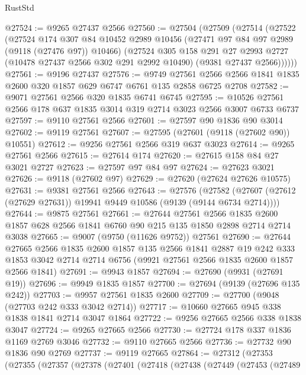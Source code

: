 \begin{lexlean}{RustStd}
\begin{coremodule}
@27524 := @9265 @27437 @2566
@27560 := @27504
    (@27509
      (@27514
        (@27522
          (@27524
            @174
            @307
            @84
            @10452
            @2989
            @10456
            (@27471 @97 @84 @97 @2989 (@9118 (@27476 @97)) @10466)
            (@27524
              @305
              @158
              @291
              @27
              @2993
              @2727
              (@10478 @27437 @2566 @302 @291 @2992 @10490)
              (@9381 @27437 @2566))))))
@27561 := @9196 @27437
@27576 := @9749
    @27561
    @2566
    @2566
    @1841
    @1835
    @2600
    @320
    @1857
    @629
    @6747
    @6761
    @135
    @2858
    @6725
    @2708
@27582 := @9071 @27561 @2566 @320 @1835 @6741 @6745
@27595 := @10526 @27561 @2566 @178 @637 @1835 @3014 @319 @2714 @3023 @2566 @3007 @6733 @6737
@27597 := @9110 @27561 @2566
@27601 := @27597 @90 @1836 @90 @3014
@27602 := @9119 @27561
@27607 := @27595 (@27601 (@9118 (@27602 @90)) @10551)
@27612 := @9256 @27561 @2566 @319 @637 @3023
@27614 := @9265 @27561 @2566
@27615 := @27614 @174
@27620 := @27615 @158 @84 @27 @3021 @2727
@27623 := @27597 @97 @84 @97
@27624 := @27623 @3021
@27626 := @9118 (@27602 @97)
@27629 := @27620 (@27624 @27626 @10575)
@27631 := @9381 @27561 @2566
@27643 := @27576
    (@27582 (@27607 (@27612 (@27629 @27631)) @19941 @9449 @10586 (@9139 (@9144 @6734 @2714))))
@27644 := @9875 @27561
@27661 := @27644
    @27561
    @2566
    @1835
    @2600
    @1857
    @628
    @2566
    @1841
    @6760
    @90
    @215
    @135
    @1850
    @2898
    @2714
    @2714
    @3038
@27665 := @9007 (@9750 (@11626 @9752)) @27561
@27690 := @27644
    @27665
    @2566
    @1835
    @2600
    @1857
    @135
    @2566
    @1841
    @2887
    @19
    @242
    @333
    @1853
    @3042
    @2714
    @2714
    @6756
    (@9921 @27561 @2566 @1835 @2600 @1857 @2566 @1841)
@27691 := @9943 @1857
@27694 := @27690 (@9931 (@27691 @19))
@27696 := @9949 @1835 @1857
@27700 := @27694 (@9139 (@27696 @135 @242))
@27703 := @9957 @27561 @1835 @2600
@27709 := @27700 (@9048 (@27703 @242 @333 @3042 @2714))
@27717 := @10660 @27665 @945 @338 @1838 @1841 @2714 @3047 @1864
@27722 := @9256 @27665 @2566 @338 @1838 @3047
@27724 := @9265 @27665 @2566
@27730 := @27724 @178 @337 @1836 @1169 @2769 @3046
@27732 := @9110 @27665 @2566
@27736 := @27732 @90 @1836 @90 @2769
@27737 := @9119 @27665
@27864 := @27312
    (@27353
      (@27355
        (@27357
          (@27378
            (@27401
              (@27418
                (@27438
                  (@27449
                    (@27453
                      (@27489

\end{coremodule}
\end{lexlean}
